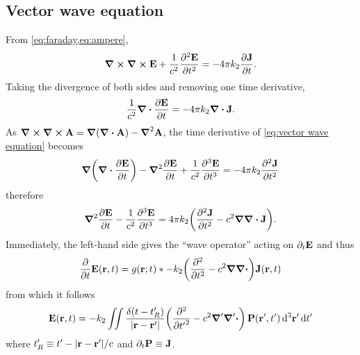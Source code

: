 \subsection{\label{appendix:vector wave equation}Vector wave equation}

From \cref{eq:faraday,eq:ampere},
\begin{equation}
  \curl{\curl{\vb{E}}} + \frac{1}{c^2} \pdv[2]{\vb{E}}{t} = -4\pi k_2 \pdv{\vb{J}}{t}.
  \label{eq:vector wave equation}
\end{equation}
Taking the divergence of both sides and removing one time derivative,
\begin{equation*}
  \frac{1}{c^2} \div{\pdv{\vb{E}}{t}} = -4 \pi k_2 \div{\vb{J}}.
\end{equation*}
As $\curl{\curl{\vb{A}}} = \grad{\qty(\div{\vb{A}})} - \grad^2{\vb{A}}$, the time derivative of \cref{eq:vector wave equation} becomes
\begin{equation*}
  \grad{\qty(\div{\pdv{\vb{E}}{t}})} - \grad^2 \pdv{\vb{E}}{t} + \frac{1}{c^2} \pdv[3]{\vb{E}}{t} = -4\pi k_2 \pdv[2]{\vb{J}}{t}
\end{equation*}
therefore
\begin{equation*}
  \grad^2 \pdv{\vb{E}}{t} - \frac{1}{c^2} \pdv[3]{\vb{E}}{t} = 4\pi k_2 \qty(\pdv[2]{\vb{J}}{t} - c^2 \grad \div{\vb{J}}).
\end{equation*}
Immediately, the left-hand side gives the ``wave operator'' acting on $\partial_t \vb{E}$ and thus
\begin{equation*}
  \pdv{t} \vb{E}(\vb{r}, t) = g(\vb{r}; t) \ast -k_2\qty(\pdv[2]{t} - c^2 \grad \div) \vb{J}(\vb{r}, t)
\end{equation*}
from which it follows
\begin{equation}
  \vb{E}(\vb{r}, t) = -k_2 \iint \frac{\delta\qty(t - t'_R )}{\abs{\vb{r} - \vb{r}'}} \qty(\pdv[2]{{t'}} - c^2 \grad' \grad'\boldsymbol{\cdot}) \, \vb{P}(\vb{r}', t') \dd[3]{\vb{r}'} \dd{t'}
\end{equation}
where $t'_R \equiv t' - \abs{\vb{r} - \vb{r}'}/c$ and $\partial_t \vb{P} \equiv \vb{J}$.

